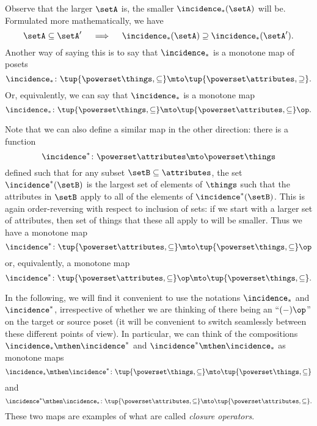 {Observe that the larger $\setA$ is, the smaller $\incidence_*(\setA)$ will be. Formulated more mathematically, we have
\begin{equation}
\setA \subseteq \setA' \quad \implies \quad \incidence_*(\setA) \supseteq \incidence_*(\setA').
\end{equation}
Another way of saying this is to say that $\incidence_*$ is a monotone map of posets 
\begin{equation}
\incidence_* \colon \tup{\powerset \things, \subseteq} \mto \tup{\powerset \attributes, \supseteq}. 
\end{equation}
Or, equivalently, we can say that $\incidence_*$ is a monotone map
\begin{equation}
\incidence_* \colon \tup{\powerset \things, \subseteq} \mto \tup{\powerset \attributes, \subseteq}\op. 
\end{equation}

Note that we can also define a similar map in the other direction: there is a function
\begin{equation}
\incidence^* \colon \powerset \attributes \mto \powerset \things
\end{equation}
defined such that for any subset $\setB \subseteq \attributes$, the set $\incidence^*(\setB)$ is the largest set of elements of $\things$ such that the attributes in $\setB$ apply to all of the elements of $\incidence^*(\setB)$. This is again order-reversing with respect to inclusion of sets: if we start with a larger set of attributes, then set of things that these all apply to will be smaller. Thus we have a monotone map 
\begin{equation}
\incidence^* \colon \tup{\powerset \attributes, \subseteq} \mto \tup{\powerset \things, \subseteq}\op
\end{equation}
or, equivalently, a monotone map
\begin{equation}
\incidence^* \colon \tup{\powerset \attributes, \subseteq}\op \mto \tup{\powerset \things, \subseteq}.
\end{equation}

In the following, we will find it convenient to use the notations $\incidence_*$ and $\incidence^*$, irrespective of whether we are thinking of there being an ``$( - )\op $'' on the target or source poset (it will be convenient to switch seamlessly between these different points of view). In particular, we can think of the compositions $\incidence_* \mthen \incidence^*$ and $\incidence^* \mthen \incidence_*$ as monotone maps 
\begin{equation}
\incidence_* \mthen \incidence^* \colon \tup{\powerset \things, \subseteq} \mto \tup{\powerset \things, \subseteq}
\end{equation}
and 
\begin{equation}
\incidence^* \mthen \incidence_* \colon \tup{\powerset \attributes, \subseteq} \mto \tup{\powerset \attributes, \subseteq}.
\end{equation}
These two maps are examples of what are called \emph{closure operators}.


}
